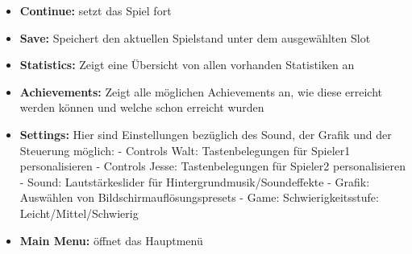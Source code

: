 \begin{itemize}
    \item \textbf{Continue:} setzt das Spiel fort
    \item \textbf{Save:} Speichert den aktuellen Spielstand unter dem ausgewählten Slot
    \item  \textbf{Statistics:} Zeigt eine Übersicht von allen vorhanden Statistiken an
    \item  \textbf{Achievements:} Zeigt alle möglichen Achievements an, wie diese erreicht werden können und welche schon erreicht wurden
    \item \textbf{Settings:} Hier sind Einstellungen bezüglich des Sound, der Grafik und der Steuerung möglich: \newline
    - Controls Walt: Tastenbelegungen für Spieler1 personalisieren \newline
    - Controls Jesse: Tastenbelegungen für Spieler2 personalisieren \newline
    - Sound: Lautstärkeslider für Hintergrundmusik/Soundeffekte \newline
    - Grafik: Auswählen von Bildschirmauflösungspresets \newline
    - Game: Schwierigkeitsstufe: Leicht/Mittel/Schwierig
    \item \textbf{Main Menu:} öffnet das Hauptmenü
\end{itemize}
\newpage
